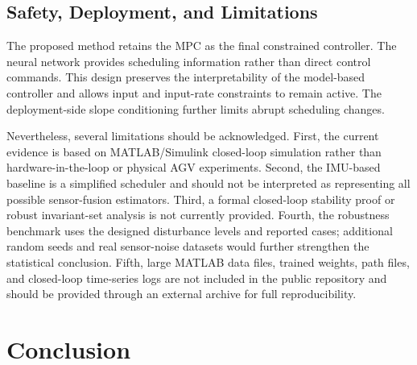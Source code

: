 \documentclass[twocolumn]{article}
\begin{document}

\subsection{Safety, Deployment, and Limitations}

The proposed method retains the MPC as the final constrained controller. The neural network provides scheduling information rather than direct control commands. This design preserves the interpretability of the model-based controller and allows input and input-rate constraints to remain active. The deployment-side slope conditioning further limits abrupt scheduling changes.

Nevertheless, several limitations should be acknowledged. First, the current evidence is based on MATLAB/Simulink closed-loop simulation rather than hardware-in-the-loop or physical AGV experiments. Second, the IMU-based baseline is a simplified scheduler and should not be interpreted as representing all possible sensor-fusion estimators. Third, a formal closed-loop stability proof or robust invariant-set analysis is not currently provided. Fourth, the robustness benchmark uses the designed disturbance levels and reported cases; additional random seeds and real sensor-noise datasets would further strengthen the statistical conclusion. Fifth, large MATLAB data files, trained weights, path files, and closed-loop time-series logs are not included in the public repository and should be provided through an external archive for full reproducibility.

\section{Conclusion}

\label{sec:conclusion}
\end{document}
